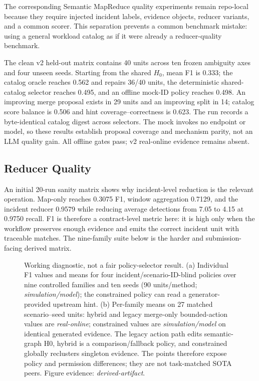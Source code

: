 \documentclass[sigplan,anonymous,nonacm]{acmart}
\newcommand{\systemname}{Semantic MapReduce}
\begin{document}
The corresponding \systemname{} quality experiments remain repo-local because they require injected incident labels, evidence objects, reducer variants, and a common scorer. This separation prevents a common benchmark mistake: using a general workload catalog as if it were already a reducer-quality benchmark.

The clean v2 held-out matrix contains 40 units across ten frozen ambiguity axes and four unseen seeds. Starting from the shared $H_0$, mean F1 is 0.333; the catalog oracle reaches 0.562 and repairs 36/40 units, the deterministic shared-catalog selector reaches 0.495, and an offline mock-ID policy reaches 0.498. An improving merge proposal exists in 29 units and an improving split in 14; catalog score balance is 0.506 and hint coverage--correctness is 0.623. The run records a byte-identical catalog digest across selectors. The mock invokes no endpoint or model, so these results establish proposal coverage and mechanism parity, not an LLM quality gain. All offline gates pass; v2 real-online evidence remains absent.

\subsection{Reducer Quality}

An initial 20-run sanity matrix shows why incident-level reduction is the relevant operation. Map-only reaches 0.3075 F1, window aggregation 0.7129, and the incident reducer 0.9579 while reducing average detections from 7.05 to 4.15 at 0.9750 recall. F1 is therefore a contract-level metric here: it is high only when the workflow preserves enough evidence and emits the correct incident unit with traceable matches. The nine-family suite below is the harder and submission-facing derived matrix.

\begin{figure}[t]
\centering

\caption{Working diagnostic, not a fair policy-selector result. (a) Individual F1 values and means for four incident/scenario-ID-blind policies over nine controlled families and ten seeds (90 units/method; \emph{simulation/model}); the constrained policy can read a generator-provided upstream hint. (b) Per-family means on 27 matched scenario--seed units: hybrid and legacy merge-only bounded-action values are \emph{real-online}; constrained values are \emph{simulation/model} on identical generated evidence. The legacy action path edits semantic-graph H0, hybrid is a comparison/fallback policy, and constrained globally reclusters singleton evidence. The points therefore expose policy and permission differences; they are not task-matched SOTA peers. Figure evidence: \emph{derived-artifact}.}
\label{fig:baseline-comparison}
\end{figure}
\end{document}
